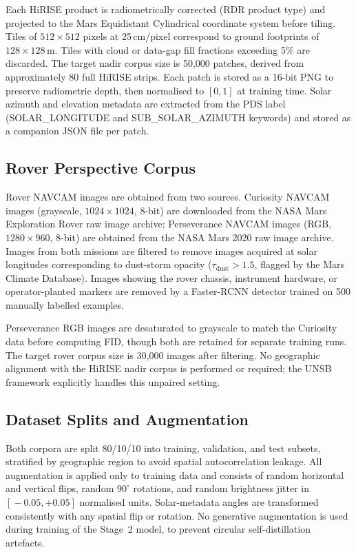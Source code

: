 \documentclass[10pt,journal]{IEEEtran}
\begin{document}
Each HiRISE product is radiometrically corrected (RDR product type) and
projected to the Mars Equidistant Cylindrical coordinate system before
tiling. Tiles of $512 \times 512$ pixels at 25\,cm/pixel correspond to ground
footprints of $128 \times 128$\,m. Tiles with cloud or data-gap fill fractions
exceeding 5\% are discarded. The target nadir corpus size is 50,000 patches,
derived from approximately 80 full HiRISE strips. Each patch is stored as a
16-bit PNG to preserve radiometric depth, then normalised to $[0, 1]$ at
training time. Solar azimuth and elevation metadata are extracted from the
PDS label (SOLAR\_LONGITUDE and SUB\_SOLAR\_AZIMUTH keywords) and stored as
a companion JSON file per patch.

\subsection{Rover Perspective Corpus}
Rover NAVCAM images are obtained from two sources. Curiosity NAVCAM images
(grayscale, $1024 \times 1024$, 8-bit) are downloaded from the NASA Mars
Exploration Rover raw image archive; Perseverance NAVCAM images (RGB,
$1280 \times 960$, 8-bit) are obtained from the NASA Mars 2020 raw image
archive. Images from both missions are filtered to remove images acquired at
solar longitudes corresponding to dust-storm opacity
($\tau_{\mathrm{dust}} > 1.5$, flagged by the Mars Climate Database).
Images showing the rover chassis, instrument hardware, or operator-planted
markers are removed by a Faster-RCNN detector trained on 500 manually
labelled examples.

Perseverance RGB images are desaturated to grayscale to match the Curiosity
data before computing FID, though both are retained for separate training
runs. The target rover corpus size is 30,000 images after filtering. No
geographic alignment with the HiRISE nadir corpus is performed or required;
the UNSB framework explicitly handles this unpaired setting.

\subsection{Dataset Splits and Augmentation}
Both corpora are split 80/10/10 into training, validation, and test subsets,
stratified by geographic region to avoid spatial autocorrelation leakage. All
augmentation is applied only to training data and consists of random
horizontal and vertical flips, random $90^{\circ}$ rotations, and random
brightness jitter in $[\!-\!0.05, +0.05]$ normalised units. Solar-metadata
angles are transformed consistently with any spatial flip or rotation. No
generative augmentation is used during training of the Stage~2 model, to
prevent circular self-distillation artefacts.
\end{document}
